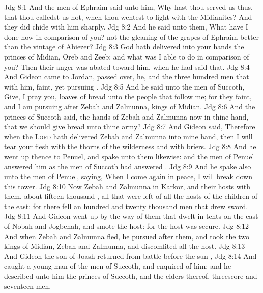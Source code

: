 \vs Jdg 8:1 And the men of Ephraim said unto him, Why hast thou served us thus, that thou calledst us not, when thou wentest to fight with the Midianites? And they did chide with him sharply.
\vs Jdg 8:2 And he said unto them, What have I done now in comparison of you?  not the gleaning of the grapes of Ephraim better than the vintage of Abiezer?
\vs Jdg 8:3 God hath delivered into your hands the princes of Midian, Oreb and Zeeb: and what was I able to do in comparison of you? Then their anger was abated toward him, when he had said that.
\vs Jdg 8:4 And Gideon came to Jordan,  passed over, he, and the three hundred men that  with him, faint, yet pursuing .
\vs Jdg 8:5 And he said unto the men of Succoth, Give, I pray you, loaves of bread unto the people that follow me; for they  faint, and I am pursuing after Zebah and Zalmunna, kings of Midian.
\vs Jdg 8:6 And the princes of Succoth said,  the hands of Zebah and Zalmunna now in thine hand, that we should give bread unto thine army?
\vs Jdg 8:7 And Gideon said, Therefore when the \textsc{Lord} hath delivered Zebah and Zalmunna into mine hand, then I will tear your flesh with the thorns of the wilderness and with briers.
\vs Jdg 8:8 And he went up thence to Penuel, and spake unto them likewise: and the men of Penuel answered him as the men of Succoth had answered .
\vs Jdg 8:9 And he spake also unto the men of Penuel, saying, When I come again in peace, I will break down this tower.
\vs Jdg 8:10 Now Zebah and Zalmunna  in Karkor, and their hosts with them, about fifteen thousand , all that were left of all the hosts of the children of the east: for there fell an hundred and twenty thousand men that drew sword.
\vs Jdg 8:11 And Gideon went up by the way of them that dwelt in tents on the east of Nobah and Jogbehah, and smote the host: for the host was secure.
\vs Jdg 8:12 And when Zebah and Zalmunna fled, he pursued after them, and took the two kings of Midian, Zebah and Zalmunna, and discomfited all the host.
\vs Jdg 8:13 And Gideon the son of Joash returned from battle before the sun ,
\vs Jdg 8:14 And caught a young man of the men of Succoth, and enquired of him: and he described unto him the princes of Succoth, and the elders thereof,  threescore and seventeen men.
